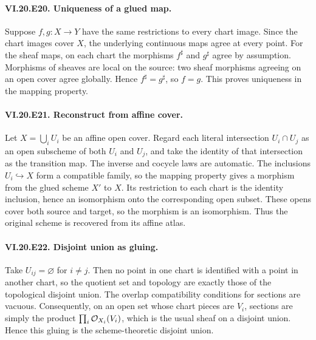\paragraph{VI.20.E20. Uniqueness of a glued map.}
\begin{solution}
Suppose $f,g:X\to Y$ have the same restrictions to every chart image.  Since the chart images cover $X$, the underlying continuous maps agree at every point.  For the sheaf maps, on each chart the morphisms $f^\sharp$ and $g^\sharp$ agree by assumption.  Morphisms of sheaves are local on the source: two sheaf morphisms agreeing on an open cover agree globally.  Hence $f^\sharp=g^\sharp$, so $f=g$.  This proves uniqueness in the mapping property.
\end{solution}

\paragraph{VI.20.E21. Reconstruct from affine cover.}
\begin{solution}
Let $X=\bigcup_iU_i$ be an affine open cover.  Regard each literal intersection $U_i\cap U_j$ as an open subscheme of both $U_i$ and $U_j$, and take the identity of that intersection as the transition map.  The inverse and cocycle laws are automatic.  The inclusions $U_i\hookrightarrow X$ form a compatible family, so the mapping property gives a morphism from the glued scheme $X'$ to $X$.  Its restriction to each chart is the identity inclusion, hence an isomorphism onto the corresponding open subset.  These opens cover both source and target, so the morphism is an isomorphism.  Thus the original scheme is recovered from its affine atlas.
\end{solution}

\paragraph{VI.20.E22. Disjoint union as gluing.}
\begin{solution}
Take $U_{ij}=\varnothing$ for $i\neq j$.  Then no point in one chart is identified with a point in another chart, so the quotient set and topology are exactly those of the topological disjoint union.  The overlap compatibility conditions for sections are vacuous.  Consequently, on an open set whose chart pieces are $V_i$, sections are simply the product $\prod_i\mathcal O_{X_i}(V_i)$, which is the usual sheaf on a disjoint union.  Hence this gluing is the scheme-theoretic disjoint union.
\end{solution}


